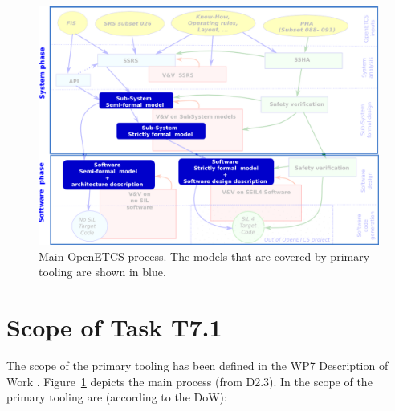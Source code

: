  \begin{figure}[b!]
  \centering
  \includegraphics[scale=0.45]{images/WholeProcess.png}
  \caption{Main OpenETCS process.  The models that are covered by primary tooling are shown in blue.}
  \label{fig:main_process}
\end{figure}


\section{Scope of Task T7.1}

The scope of the primary tooling has been defined in the WP7 Description of Work \cite{}.  Figure~\ref{fig:main_process} depicts the main process (from D2.3).  In the scope of the primary tooling are (according to the DoW):

